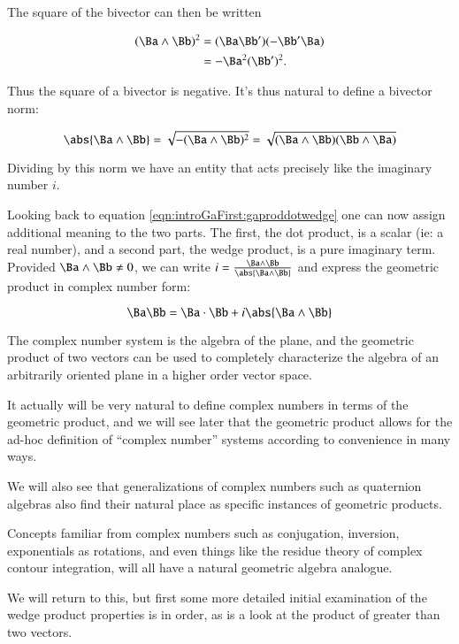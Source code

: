 The square of the bivector can then be written

\begin{align*}
(\Ba \wedge \Bb)^2
&= (\Ba \Bb')(-\Bb'\Ba) \\
&= -\Ba^2 (\Bb')^2.
\end{align*}

Thus the square of a bivector is negative.  It's thus natural to define a 
bivector norm:

\[
\abs{\Ba \wedge \Bb} = \sqrt{-(\Ba \wedge \Bb)^2} = \sqrt{ (\Ba \wedge \Bb)(\Bb \wedge \Ba) }
\]

Dividing by this norm we have an entity that acts precisely like the imaginary number $i$.

Looking back to equation \ref{eqn:introGaFirst:gaproddotwedge} one can now assign additional meaning to the two parts.  The first, the dot product, is a scalar (ie: a real number), and a second part, the wedge product, is a pure imaginary term.  Provided $\Ba \wedge \Bb \ne 0$, we can write $i = \frac{\Ba \wedge \Bb}{ \abs{\Ba \wedge \Bb} }$ and express
the geometric product in complex number form:

\[
\Ba \Bb = \Ba \cdot \Bb + i \abs{\Ba \wedge \Bb}
\]

The complex number system
is the algebra of the plane, and the geometric product of two vectors can be used to completely characterize the algebra of an arbitrarily oriented plane in a higher
order vector space.

It actually will be very natural to define complex numbers in terms of the geometric product, and we will see later that
the geometric product allows for the ad-hoc definition of ``complex number'' systems according to convenience in many ways.  

We will also see that generalizations of complex numbers such as quaternion algebras also find their natural place as specific instances of geometric products.

Concepts familiar from
complex numbers such as conjugation, inversion, exponentials as rotations, and even things like the residue theory of complex contour integration, will
all have a natural geometric algebra analogue.

We will return to this, but first some more detailed initial examination of the wedge product properties is in order, as is a look at the product of greater than
two vectors.
